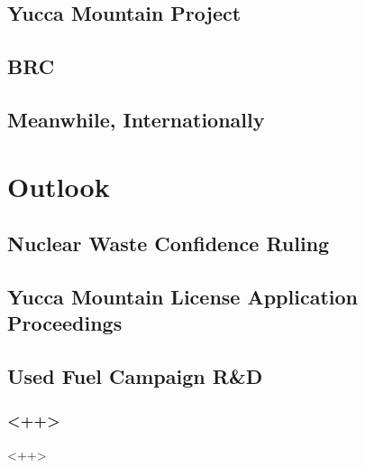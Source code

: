 \documentclass{beamer}
\begin{document}
\subsection{Yucca Mountain Project}
\subsection{BRC}
\subsection{Meanwhile, Internationally}

\section{Outlook}
\subsection{Nuclear Waste Confidence Ruling}
\subsection{Yucca Mountain License Application Proceedings}
\subsection{Used Fuel Campaign R\&D}


\begin{frame}[<+ctb!+>]
  \frametitle{<++>}
\end{frame}<++>

\end{document}
